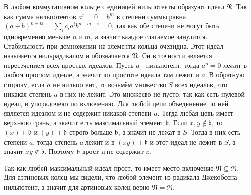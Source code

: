 \documentclass{article}
\begin{document}
\begin{enumerate}
        В любом коммутативном кольце с единицей
        нильпотенты образуют идеал $\mathfrak{N}$. Так как сумма нильпотентов
        $a^n=0=b^m$ в степени суммы равна $(a+b)^{n+m}=\sum_i c_ia^ib^{n+m-i}=0$,
        так как обе степени не могут быть одновременно меньше $n$ и $m$, а значит
        каждое слагаемое занулится. Стабильность при домножении на элементы
        кольца очевидна. Этот идеал называется нильрадикалом и обозначается
        $\mathfrak{N}$. Он в точности является пересечением всех простых
        идеалов. Пусть $a$ - нильпотент, тогда $a^n=0$ лежит в любом простом
        идеале, а значит по простоте идеала там лежит и $a$. В обратную сторону,
        если $a$ не нильпотент, то возьмём множество $S$ всех идеалов, что
        никакая степень $a$ в них не лежит. Это множесво не пусто, так как есть
        нулевой идеал, и упорядочено по включению. Для любой цепи объединение по
        ней является идеалом и не содержит никакой степени $a$. Тогда любая цепь
        имеет верхнюю грань, а значит есть максимальный элемент $\mathfrak{b}$.
        Если $x,y\notin\mathfrak{b}$, то  $(x)+\mathfrak{b}$ и $(y)+\mathfrak{b}$
        строго больше $\mathfrak{b}$, а значит не лежат в $S$. Тогда в них есть
        степени $a$, тогда степень $a$ лежит и в $(xy)+\mathfrak{b}$ и этот
        идеал не лежит в $S$, а значит $xy\notin\mathfrak{b}$. Поэтому
        $\mathfrak{b}$ прост и не содержит $a$.

        Так как любой максимальный идеал прост, то имеет место включение $
        \mathfrak{N}\subseteq\mathfrak{R}$. Для артиновых колец мы видели, что
        любой элемент из радикала Джекобсона – нильпотент, а значит для артиновых
        колец верно $\mathfrak{N}=\mathfrak{R}$.


\end{enumerate}
\end{document}
